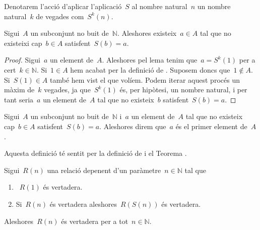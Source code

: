 \documentclass[../../main.tex]{subfiles}
\begin{document}
    \begin{notation}
        Denotarem l'acció d'aplicar l'aplicació~\(S\) al nombre natural~\(n\) un nombre natural~\(k\) de vegades com~\(S^{k}(n)\).
    \end{notation}
    \begin{theorem}
        \label{thm:primer element}
        Sigui~\(A\) un subconjunt no buit de~\(\mathbb{N}\).
        Aleshores existeix~\(a\in A\) tal que no existeixi cap~\(b\in A\) satisfent~\(S(b)=a\).
    \end{theorem}
    \begin{proof}
        Sigui~\(a\) un element de~\(A\).
        Aleshores pel lema  tenim que~\(a=S^{k}(1)\) per a cert~\(k\in\mathbb{N}\).
        Si~\(1\in A\) hem acabat per la definició de .
        Suposem doncs que~\(1\notin A\).
        Si~\(S(1)\in A\) també hem vist el que volíem.
        Podem iterar aquest procés un màxim de~\(k\) vegades, ja que~\(S^{k}(1)\) és, per hipòtesi, un nombre natural, i per tant seria~\(a\) un element de~\(A\) tal que no existeix~\(b\) satisfent~\(S(b)=a\).
    \end{proof}
    \begin{definition}
        \label{def:primer element}
        Sigui~\(A\) un subconjunt no buit de~\(\mathbb{N}\) i~\(a\) un element de~\(A\) tal que no existeix cap~\(b\in A\) satisfent~\(S(b)=a\).
        Aleshores direm que~\(a\) és el primer element de~\(A\).

        Aquesta definició té sentit per la definició de  i el Teorema .
    \end{definition}
    \begin{theorem}
        \label{thm:principi d'inducció}
        Sigui~\(R(n)\) una relació depenent d'un paràmetre~\(n\in\mathbb{N}\) tal que
        \begin{enumerate}
            \item\label{enum:thm:principi d'inducció 1}~\(R(1)\) és vertadera.
            \item\label{enum:thm:principi d'inducció 2} Si~\(R(n)\) és vertadera aleshores~\(R(S(n))\) és vertadera.
        \end{enumerate}
        Aleshores~\(R(n)\) és vertadera per a tot~\(n\in\mathbb{N}\).
    \end{theorem}
\end{document}
